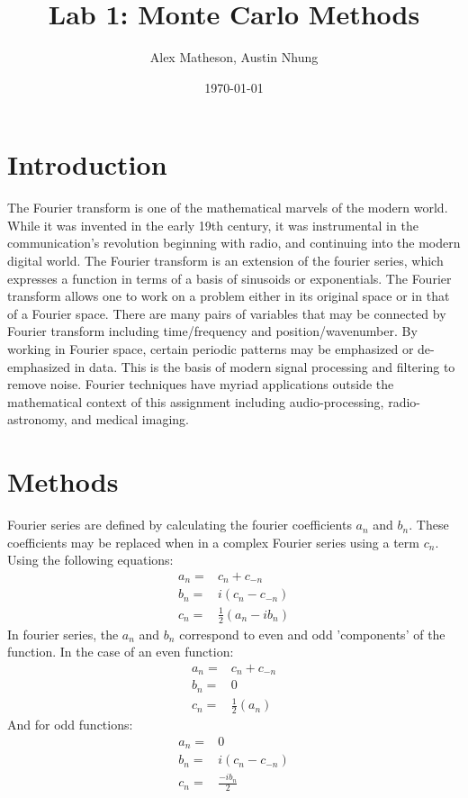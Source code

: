 \documentclass[twocolumn]{article}
\begin{document}
\title{Lab 1: Monte Carlo Methods}
\author{Alex Matheson, Austin Nhung}
\date{\today}
\maketitle

\section{Introduction}
The Fourier transform is one of the mathematical marvels of the modern world. While it was invented in the early 19th century, it was instrumental in the communication's revolution beginning with radio, and continuing into the modern digital world. The Fourier transform is an extension of the fourier series, which expresses a function in terms of a basis of sinusoids or exponentials. The Fourier transform allows one to work on a problem either in its original space or in that of a Fourier space. There are many pairs of variables that may be connected by Fourier transform including time/frequency and position/wavenumber. By working in Fourier space, certain periodic patterns may be emphasized or de-emphasized in data. This is the basis of modern signal processing and filtering to remove noise. Fourier techniques have myriad applications outside the mathematical context of this assignment including audio-processing, radio-astronomy, and medical imaging.

\section{Methods}
Fourier series are defined by calculating the fourier coefficients $a_n$ and $b_n$. These coefficients may be replaced when in a complex Fourier series using a term $c_n$. Using the following equations:
\begin{equation}
\begin{split}
a_n =& c_n + c_{-n} \\
b_n =& i(c_n - c_{-n}) \\
c_n =& \frac{1}{2}(a_n - ib_n)
\end{split}
\end{equation}
In fourier series, the $a_n$ and $b_n$ correspond to even and odd 'components' of the function. In the case of an even function:
\begin{equation}
\begin{split}
a_n =& c_n + c_{-n} \\
b_n =& 0 \\
c_n =& \frac{1}{2}(a_n)
\end{split}
\end{equation}
And for odd functions:
\begin{equation}
\begin{split}
a_n =& 0 \\
b_n =& i(c_n - c_{-n}) \\
c_n =& \frac{-ib_n}{2}
\end{split}
\end{equation} 
\end{document}

